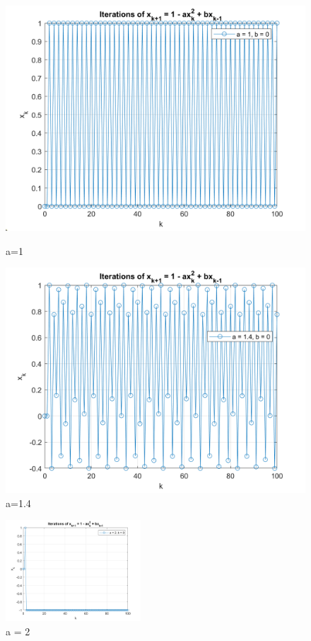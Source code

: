 \documentclass{article}
\begin{document}
\begin{enumerate} [label=\Alph*]
    \begin{figure}[h]
      \centering
      \begin{minipage}[t]{0.5\textwidth}
        \centering
        \includegraphics[width=0.8\linewidth]{Problem3_a1.png}
        \caption{a=1}
        \label{fig:img1}
      \end{minipage}%
      \begin{minipage}[t]{0.5\textwidth}
        \centering
        \includegraphics[width=0.8\linewidth]{Problem3_a1.4.png}
        \caption{a=1.4}
        \label{fig:img2}
      \end{minipage}
    \end{figure} 
    
    \begin{figure}[h]
      \centering
      \includegraphics[width=0.45\textwidth]{Problem3_a2.png}
      \caption{a = 2}
      \label{fig:a2}
    \end{figure}


\end{enumerate}
\end{document}
